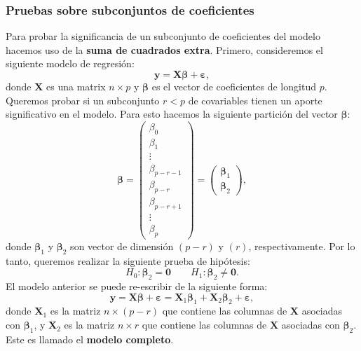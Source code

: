 \documentclass[
]{article}
\begin{document}
\hypertarget{pruebas-sobre-subconjuntos-de-coeficientes}{%
\subsubsection{Pruebas sobre subconjuntos de coeficientes}\label{pruebas-sobre-subconjuntos-de-coeficientes}}

Para probar la significancia de un subconjunto de coeficientes del modelo hacemos uso de la \textbf{suma de cuadrados extra}. Primero, consideremos el siguiente modelo de regresión:
\[
\boldsymbol y= \boldsymbol X\boldsymbol \beta+ \boldsymbol \varepsilon,
\]
donde \(\boldsymbol X\) es una matrix \(n \times p\) y \(\boldsymbol \beta\) es el vector de coeficientes de longitud \(p\). Queremos probar si un subconjunto \(r < p\) de covariables tienen un aporte significativo en el modelo. Para esto hacemos la siguiente partición del vector \(\boldsymbol \beta\):
\[
\boldsymbol \beta= \begin{pmatrix} \beta_{0} \\ \beta_{1} \\ \vdots \\ \beta_{p-r-1} \\ \hline \beta_{p-r} \\ \beta_{p-r+1} \\ \vdots \\  \beta_{p} \end{pmatrix} =  \begin{pmatrix} \boldsymbol \beta_{1} \\ \hline \boldsymbol \beta_{2}\end{pmatrix},
\]
donde \(\boldsymbol \beta_{1}\) y \(\boldsymbol \beta_{2}\) son vector de dimensión \((p-r)\) y \((r)\), respectivamente. Por lo tanto, queremos realizar la siguiente prueba de hipótesis:
\begin{equation}
H_{0}:  \boldsymbol \beta_{2} = \boldsymbol 0\qquad H_{1}:  \boldsymbol \beta_{2} \neq \boldsymbol 0.
\label{eq:Hsubset}
\end{equation}
El modelo anterior se puede re-escribir de la siguiente forma:
\[
\boldsymbol y= \boldsymbol X\boldsymbol \beta+ \boldsymbol \varepsilon= \boldsymbol X_{1}\boldsymbol \beta_{1}+ \boldsymbol X_{2}\boldsymbol \beta_{2} + \boldsymbol \varepsilon,
\]
donde \(\boldsymbol X_{1}\) es la matriz \(n\times (p-r)\) que contiene las columnas de \(\boldsymbol X\) asociadas con \(\boldsymbol \beta_{1}\), y \(\boldsymbol X_{2}\) es la matriz \(n\times r\) que contiene las columnas de \(\boldsymbol X\) asociadas con \(\boldsymbol \beta_{2}\). Este es llamado el \textbf{modelo completo}.
\end{document}
